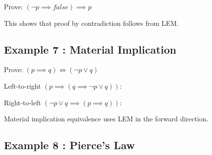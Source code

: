 \documentclass[a4paper,10pt,fleqn]{article}
\begin{document}
\noindent Prove: $(\lnot p \implies false) \implies p$

\bigskip

\begin{center}
\end{center}
\bigskip

\noindent This shows that proof by contradiction follows from LEM.

\bigskip

\subsection*{Example 7 : Material Implication}

\noindent Prove: $(p \implies q) \iff (\lnot p \lor q)$

\bigskip

\noindent Left-to-right $(p \implies (q \implies \lnot p \lor q))$:

\bigskip

\begin{center}
\end{center}
\bigskip

\noindent Right-to-left $(\lnot p \lor q \implies (p \implies q))$:

\bigskip

\begin{center}
\end{center}
\bigskip

\noindent Material implication equivalence uses LEM in the forward direction.

\bigskip

\subsection*{Example 8 : Pierce's Law}
\end{document}
